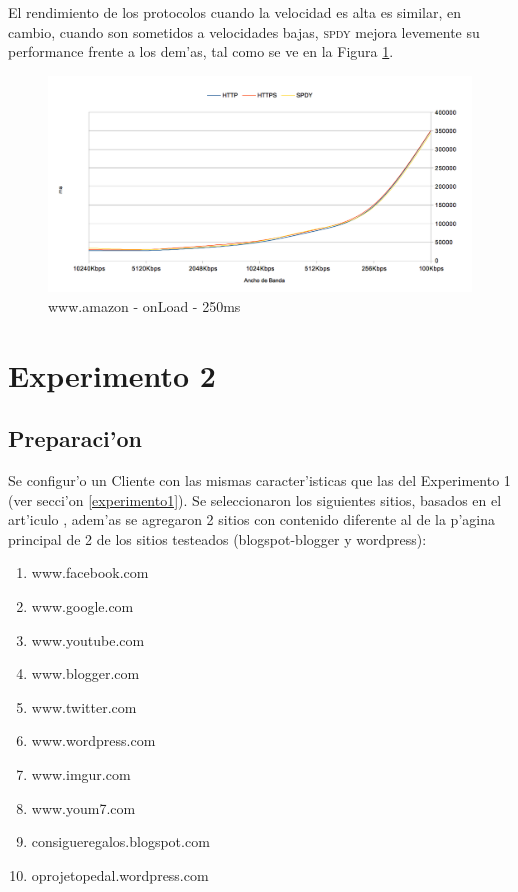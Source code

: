 \documentclass[a4paper,11pt,twocolumn]{article}
\begin{document}
El rendimiento de los protocolos cuando la velocidad es alta es similar, en cambio, cuando son sometidos a velocidades bajas, \textsc{spdy} mejora levemente su performance frente a los dem'as, tal como se ve en la Figura \ref{graf6}.

\begin{figure}[ht]
  	\centering
	\includegraphics[scale=0.65]{exp1_6}
	\caption{\small www.amazon - onLoad - 250ms}
	\label{graf6}
\end{figure}

\section{Experimento 2}
\label{experimento2}
\subsection{Preparaci'on}

Se configur'o un Cliente con las mismas caracter'isticas que las del Experimento 1 (ver secci'on \ref{experimento1}). Se seleccionaron los siguientes sitios, basados en el art'iculo \cite{effectSPDY}, adem'as se agregaron 2 sitios con contenido diferente al de la p'agina principal de 2 de los sitios testeados (blogspot-blogger y wordpress):
\begin{enumerate}
\item www.facebook.com
\item www.google.com
\item www.youtube.com
\item www.blogger.com
\item www.twitter.com
\item www.wordpress.com
\item www.imgur.com
\item www.youm7.com
\item consigueregalos.blogspot.com
\item oprojetopedal.wordpress.com
\end{enumerate}
\end{document}
